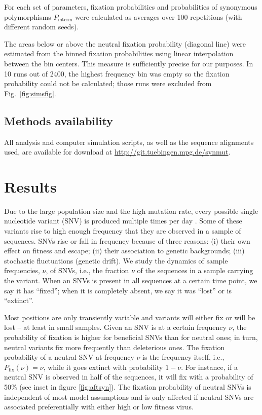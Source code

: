 \documentclass[11pt]{article}
\newcommand{\pfix}{P_{\mathrm{fix}}}
\newcommand{\FIG}[1]{Fig.~\ref{fig:#1}}
\begin{document}
For each set of parameters, fixation probabilities and probabilities of
synonymous polymorphisms $P_\text{interm}$ were calculated as averages over
100 repetitions (with different random seeds).

The areas below or above the neutral fixation probability (diagonal line) were
estimated from the binned fixation probabilities using linear interpolation
between the bin centers. This measure is sufficiently precise for our purposes.
In 10 runs out of 2400, the highest frequency bin was empty so the fixation
probability could not be calculated; those runs were excluded from
\FIG{simsfig}.

\subsection*{Methods availability}
All analysis and computer simulation scripts, as well as the sequence alignments
used, are available for download at \url{http://git.tuebingen.mpg.de/synmut}.


\section*{Results}
Due to the large population size and the high mutation rate, every
possible single nucleotide variant (SNV) is produced multiple times per
day \citep{coffin_hiv_1995}. Some of these variants rise to high enough
frequency that they are observed in a sample of sequences. SNVs rise or fall in 
frequency because of three reasons: (i) their own effect on fitness and escape; (ii)
their association to genetic backgrounds; (iii) stochastic fluctuations
(genetic drift). We study the dynamics of sample frequencies, $\nu$, of SNVs,
i.e., the fraction $\nu$ of the sequences in a sample carrying
the variant. When an SNVs is present in all sequences 
at a certain time point, we say it has ``fixed''; when it is completely absent,
we say it was ``lost'' or is ``extinct''. 

Most positions are only transiently variable and variants will either fix or
will be lost -- at least in small samples. Given an SNV is at a certain
frequency $\nu$, the probability of fixation is higher for beneficial
SNVs than for neutral ones; in turn, neutral variants fix more frequently than
deleterious ones. The fixation probability of a
neutral SNV at frequency $\nu$ is the frequency itself, i.e.,
$\pfix(\nu) = \nu$, while it goes extinct with probability $1-\nu$. For
instance, if a neutral SNV is observed in half of the sequences, it will
fix with a probability of 50\% (see inset in figure
\ref{fig:aftsyn}). The fixation probability of neutral SNVs is
independent of most model assumptions and is only affected if neutral
SNVs are associated preferentially with either high or low fitness
virus.
\end{document}
